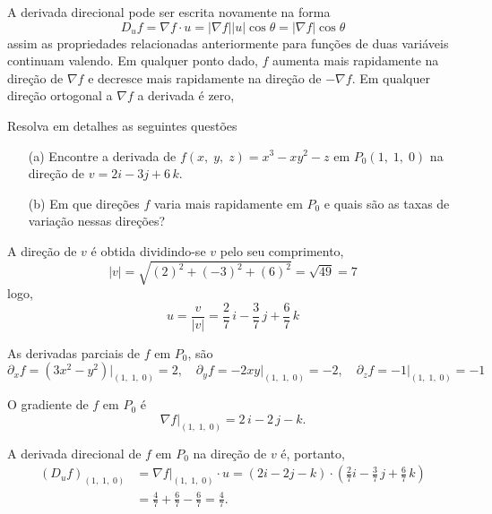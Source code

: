 A derivada direcional pode ser escrita novamente na forma
\begin{equation*}
	D_{u}f= \nabla f \cdot u =|\nabla f||u| \cos \theta= |\nabla f|\cos \theta
\end{equation*}
assim as propriedades relacionadas anteriormente para funções de duas variáveis continuam valendo. Em qualquer ponto
dado, \(f\) aumenta mais rapidamente na direção de \(\nabla f\) e decresce mais rapidamente na direção de \(-\nabla
f\). Em qualquer direção ortogonal a \(\nabla f\) a derivada é zero,

\begin{exc}
	Resolva em detalhes as seguintes questões
	\begin{enumerate}
		\item[\rm{(a)}] Encontre a derivada de \(f(x,\; y,\; z) = x^{3}-xy^{2}-z\) em \(P_{0}(1,\; 1,\; 0)\) na direção de \(v = 2i
		-3j + 6\, k\).
		\item[\rm{(b)}] Em que direções \(f\) varia mais rapidamente em \(P_{0}\) e quais são as taxas de variação nessas direções?
	\end{enumerate}
\end{exc}

\solo
A direção de \(v\) é obtida dividindo-se \(v\) pelo seu comprimento,
\begin{equation*}
	|v|=\sqrt{(2)^{2}+(-3)^{2}+(6)^{2}}=\sqrt{49}=7
\end{equation*}
logo,
\begin{equation*}
	u=\frac{v}{|v|}=\frac{2}{7}\, i -\frac{3}{7}\, j+\frac{6}{7}\,k
\end{equation*}

As derivadas parciais de \(f\) em \(P_{0}\), são
\begin{equation*}
	\partial_{x}f=(3x^{2}-y^{2})\Big\vert_{(1,\;1, \; 0)}=2, \quad \partial_{y}f=-2xy\Big\vert_{(1,\;1, \; 0)}=-2, \quad \partial_{z}f=-1\Big\vert_{(1,\;1, \; 0)}=-1
\end{equation*}

O gradiente de \(f\) em \(P_{0}\) é
\begin{equation*}
	\nabla f\Big\vert_{(1,\; 1, \; 0)}=2\,i-2\,j-k.
\end{equation*}

A derivada direcional de \(f\) em \(P_{0}\) na direção de \(v\) é, portanto,
\begin{align*}
	(D_{u}f)_{(1,\;1,\; 0)} & = \nabla f\Big\vert_{(1,\; 1, \; 0)}\cdot u =(2i-2j-k)\cdot \left(\frac{2}{7}i-\frac{3}{7}\,j+\frac{6}{7}\, k \right) \\[2ex]
	&=\frac{4}{7}+\frac{6}{7}-\frac{6}{7}=\frac{4}{7}.
\end{align*}

